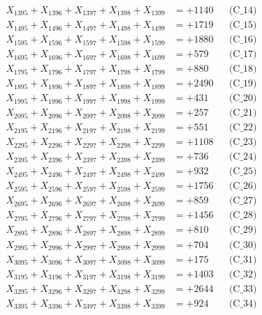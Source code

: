 \documentclass[a4paper,10pt]{article}
\begin{document}
{\begin{align}
X_{1395} + X_{1396} + X_{1397} + X_{1398} + X_{1399} &= +1140 && \text{(C\_14)} \\
X_{1495} + X_{1496} + X_{1497} + X_{1498} + X_{1499} &= +1719 && \text{(C\_15)} \\
\allowbreak
X_{1595} + X_{1596} + X_{1597} + X_{1598} + X_{1599} &= +1880 && \text{(C\_16)} \\
X_{1695} + X_{1696} + X_{1697} + X_{1698} + X_{1699} &= +579 && \text{(C\_17)} \\
X_{1795} + X_{1796} + X_{1797} + X_{1798} + X_{1799} &= +880 && \text{(C\_18)} \\
X_{1895} + X_{1896} + X_{1897} + X_{1898} + X_{1899} &= +2490 && \text{(C\_19)} \\
X_{1995} + X_{1996} + X_{1997} + X_{1998} + X_{1999} &= +431 && \text{(C\_20)} \\
\allowbreak
X_{2095} + X_{2096} + X_{2097} + X_{2098} + X_{2099} &= +257 && \text{(C\_21)} \\
X_{2195} + X_{2196} + X_{2197} + X_{2198} + X_{2199} &= +551 && \text{(C\_22)} \\
X_{2295} + X_{2296} + X_{2297} + X_{2298} + X_{2299} &= +1108 && \text{(C\_23)} \\
X_{2395} + X_{2396} + X_{2397} + X_{2398} + X_{2399} &= +736 && \text{(C\_24)} \\
X_{2495} + X_{2496} + X_{2497} + X_{2498} + X_{2499} &= +932 && \text{(C\_25)} \\
\allowbreak
X_{2595} + X_{2596} + X_{2597} + X_{2598} + X_{2599} &= +1756 && \text{(C\_26)} \\
X_{2695} + X_{2696} + X_{2697} + X_{2698} + X_{2699} &= +859 && \text{(C\_27)} \\
X_{2795} + X_{2796} + X_{2797} + X_{2798} + X_{2799} &= +1456 && \text{(C\_28)} \\
X_{2895} + X_{2896} + X_{2897} + X_{2898} + X_{2899} &= +810 && \text{(C\_29)} \\
X_{2995} + X_{2996} + X_{2997} + X_{2998} + X_{2999} &= +704 && \text{(C\_30)} \\
\allowbreak
X_{3095} + X_{3096} + X_{3097} + X_{3098} + X_{3099} &= +175 && \text{(C\_31)} \\
X_{3195} + X_{3196} + X_{3197} + X_{3198} + X_{3199} &= +1403 && \text{(C\_32)} \\
X_{3295} + X_{3296} + X_{3297} + X_{3298} + X_{3299} &= +2644 && \text{(C\_33)} \\
X_{3395} + X_{3396} + X_{3397} + X_{3398} + X_{3399} &= +924 && \text{(C\_34)} \\

\end{align}}
\end{document}
